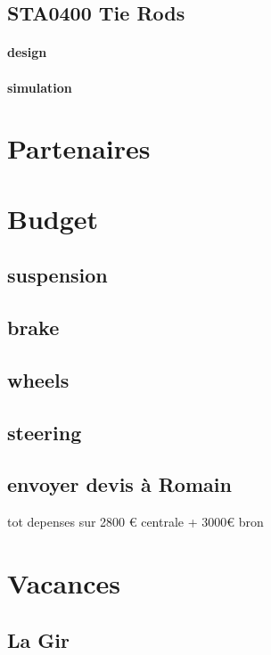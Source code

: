 	\subsection*{ST\textunderscore A0400 Tie Rods} 
 \par 
		\paragraph{design} 
		\paragraph{simulation} 
\newpage 
 \section*{Partenaires} 
 \par 
\newpage 
 \section*{Budget} 
 \par 
	\subsection*{suspension} 
 \par 
	\subsection*{brake} 
 \par 
	\subsection*{wheels} 
 \par 
	\subsection*{steering} 
 \par 
	\subsection*{envoyer devis à Romain} 
 \par tot depenses sur 2800 € centrale + 3000€ bron
\newpage 
 \section*{Vacances} 
 \par 
	\subsection*{La Gir} 
 \par 
